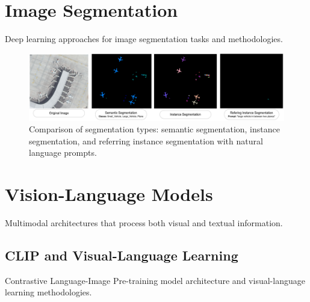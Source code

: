 \section{Image Segmentation}

Deep learning approaches for image segmentation tasks and methodologies.

\begin{figure}[htbp]
\centering
\includegraphics[width=1.0\textwidth]{Images/segmentation.png}
\caption{Comparison of segmentation types: semantic segmentation, instance segmentation, and referring instance segmentation with natural language prompts.}
\label{fig:segmentation}
\end{figure}

\section{Vision-Language Models}

Multimodal architectures that process both visual and textual information.

\subsection{CLIP and Visual-Language Learning}

Contrastive Language-Image Pre-training model architecture and visual-language learning methodologies.


